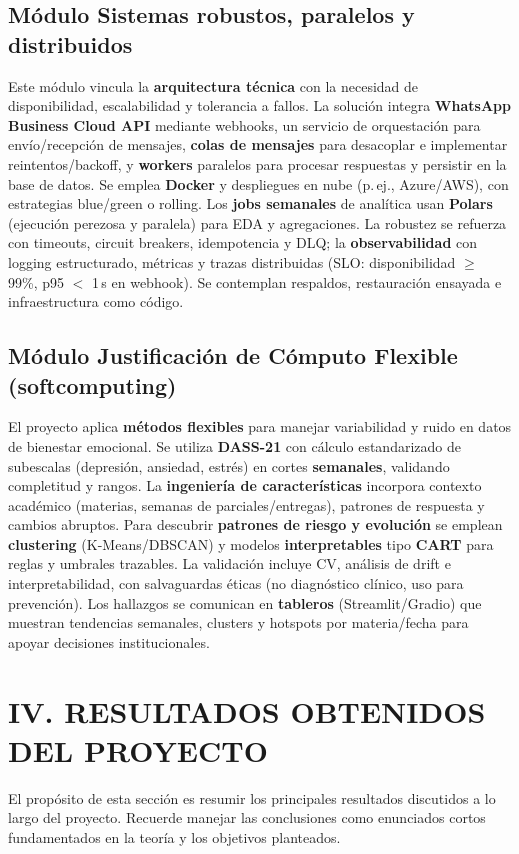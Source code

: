 ﻿\documentclass[10pt,twocolumn]{article}
\begin{document}
\subsection*{Módulo Sistemas robustos, paralelos y distribuidos}
Este módulo vincula la \textbf{arquitectura técnica} con la necesidad de disponibilidad, escalabilidad y tolerancia a fallos. La solución integra \textbf{WhatsApp Business Cloud API} mediante webhooks, un servicio de orquestación para envío/recepción de mensajes, \textbf{colas de mensajes} para desacoplar e implementar reintentos/backoff, y \textbf{workers} paralelos para procesar respuestas y persistir en la base de datos. Se emplea \textbf{Docker} y despliegues en nube (p.\,ej., Azure/AWS), con estrategias blue/green o rolling. Los \textbf{jobs semanales} de analítica usan \textbf{Polars} (ejecución perezosa y paralela) para EDA y agregaciones. La robustez se refuerza con timeouts, circuit breakers, idempotencia y DLQ; la \textbf{observabilidad} con logging estructurado, métricas y trazas distribuidas (SLO: disponibilidad $\geq$ 99\%, p95 $<$ 1\,s en webhook). Se contemplan respaldos, restauración ensayada e infraestructura como código.

\subsection*{Módulo Justificación de Cómputo Flexible (softcomputing)}
El proyecto aplica \textbf{métodos flexibles} para manejar variabilidad y ruido en datos de bienestar emocional. Se utiliza \textbf{DASS{-}21} con cálculo estandarizado de subescalas (depresión, ansiedad, estrés) en cortes \textbf{semanales}, validando completitud y rangos. La \textbf{ingeniería de características} incorpora contexto académico (materias, semanas de parciales/entregas), patrones de respuesta y cambios abruptos. Para descubrir \textbf{patrones de riesgo y evolución} se emplean \textbf{clustering} (K{-}Means/DBSCAN) y modelos \textbf{interpretables} tipo \textbf{CART} para reglas y umbrales trazables. La validación incluye CV, análisis de drift e interpretabilidad, con salvaguardas éticas (no diagnóstico clínico, uso para prevención). Los hallazgos se comunican en \textbf{tableros} (Streamlit/Gradio) que muestran tendencias semanales, clusters y hotspots por materia/fecha para apoyar decisiones institucionales.

\section*{IV. RESULTADOS OBTENIDOS DEL PROYECTO}
El propósito de esta sección es resumir los principales resultados discutidos a lo largo del proyecto. Recuerde manejar las conclusiones como enunciados cortos fundamentados en la teoría y los objetivos planteados.
\end{document}
